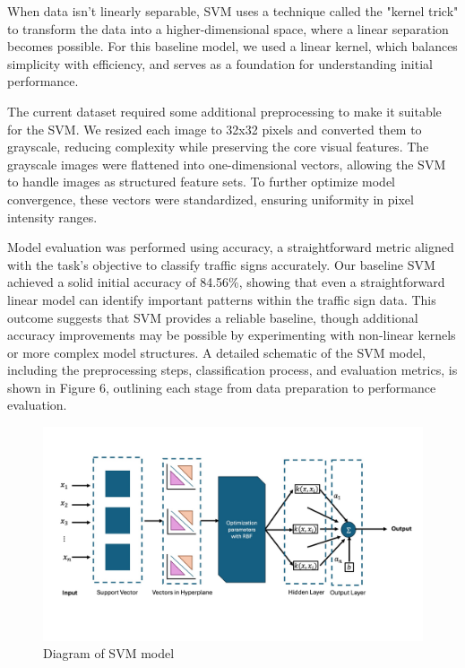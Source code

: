 \documentclass{article} %
\begin{document}
When data isn’t linearly separable, SVM uses a technique called the "kernel trick" to transform the data into a higher-dimensional space, where a linear separation becomes possible. For this baseline model, we used a linear kernel, which balances simplicity with efficiency, and serves as a foundation for understanding initial performance.

The current dataset required some additional preprocessing to make it suitable for the SVM. We resized each image to 32x32 pixels and converted them to grayscale, reducing complexity while preserving the core visual features. The grayscale images were flattened into one-dimensional vectors, allowing the SVM to handle images as structured feature sets. To further optimize model convergence, these vectors were standardized, ensuring uniformity in pixel intensity ranges.

Model evaluation was performed using accuracy, a straightforward metric aligned with the task's objective to classify traffic signs accurately. Our baseline SVM achieved a solid initial accuracy of 84.56\%, showing that even a straightforward linear model can identify important patterns within the traffic sign data. This outcome suggests that SVM provides a reliable baseline, though additional accuracy improvements may be possible by experimenting with non-linear kernels or more complex model structures. A detailed schematic of the SVM model, including the preprocessing steps, classification process, and evaluation metrics, is shown in Figure 6, outlining each stage from data preparation to performance evaluation.

\newpage
\begin{figure}[h]
\begin{center}
\includegraphics[width=\textwidth]{Figs/Figure_2_for_baseline.jpg}
\end{center}
\caption{Diagram of SVM model}
\end{figure} 
\end{document}
